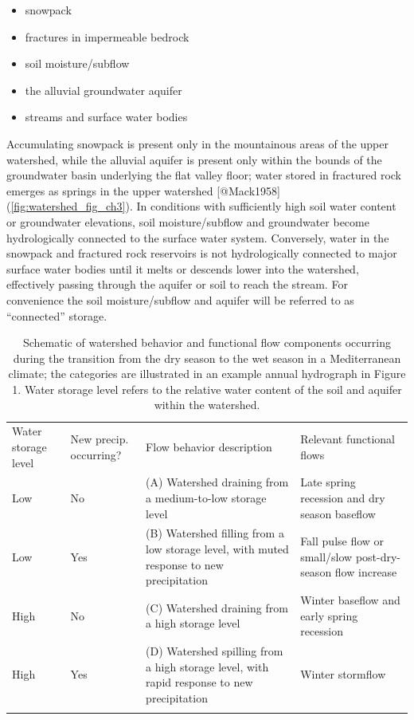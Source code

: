 \documentclass[
]{article}
\providecommand{\tightlist}{%
  \setlength{\itemsep}{0pt}\setlength{\parskip}{0pt}}
\begin{document}
\begin{itemize}
\tightlist
\item
  snowpack
\item
  fractures in impermeable bedrock
\item
  soil moisture/subflow
\item
  the alluvial groundwater aquifer
\item
  streams and surface water bodies
\end{itemize}

Accumulating snowpack is present only in the mountainous areas of the
upper watershed, while the alluvial aquifer is present only within the
bounds of the groundwater basin underlying the flat valley floor; water
stored in fractured rock emerges as springs in the upper watershed
{[}@Mack1958{]} (\autoref{fig:watershed_fig_ch3}). In conditions with
sufficiently high soil water content or groundwater elevations, soil
moisture/subflow and groundwater become hydrologically connected to the
surface water system. Conversely, water in the snowpack and fractured
rock reservoirs is not hydrologically connected to major surface water
bodies until it melts or descends lower into the watershed, effectively
passing through the aquifer or soil to reach the stream. For convenience
the soil moisture/subflow and aquifer will be referred to as
``connected'' storage.

\begin{table}[t]
\caption{Schematic of watershed behavior and functional flow components occurring during the transition from the dry season to the wet season in a Mediterranean climate; the categories are illustrated in an example annual hydrograph in Figure 1. Water storage level refers to the relative water content of the soil and aquifer within the watershed.}
\label{tab:watershed_modes_tab}
\begin{tabular}{p{1.8cm} p{1.6cm} p{4.8cm} p{5cm}}
\tophline
Water storage level & New precip. occurring? & Flow behavior description & Relevant functional flows \\
\middlehline
 Low & No & (A) Watershed draining from a medium-to-low storage level & Late spring recession and dry season baseflow \\ 
 \middlehline
Low & Yes & (B) Watershed filling from a low storage level, with muted response to new precipitation & Fall pulse flow or small/slow post-dry-season flow increase \\
\middlehline
High & No & (C) Watershed draining from a high storage level & Winter baseflow and early spring recession \\
\middlehline
High & Yes & (D) Watershed spilling from a high storage level, with rapid response to new precipitation & Winter stormflow\\
\bottomhline
\end{tabular}
\belowtable{}
\end{table}
\end{document}
